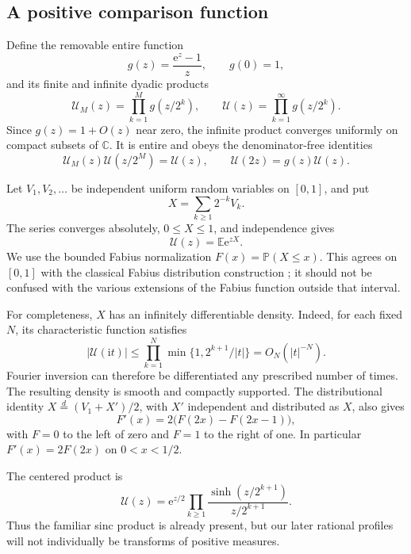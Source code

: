 \documentclass[11pt,letterpaper]{article}
\numberwithin{equation}{section}
\theoremstyle{definition}
\theoremstyle{remark}
\newcommand{\C}{\mathbb C}
\newcommand{\ii}{\mathrm i}
\newcommand{\E}{\mathbb E}
\newcommand{\Prob}{\mathbb P}
\newcommand{\Up}{\mathcal U}
\newcommand{\e}{\mathrm e}
\begin{document}
\subsection{A positive comparison function}
Define the removable entire function
\begin{equation}
 g(z)=\frac{\e^z-1}{z},\qquad g(0)=1,
\end{equation}
and its finite and infinite dyadic products
\begin{equation}
 \Up_M(z)=\prod_{k=1}^M g(z/2^k),\qquad
 \Up(z)=\prod_{k=1}^{\infty}g(z/2^k).
 \label{eq:U}
\end{equation}
Since \(g(z)=1+O(z)\) near zero, the infinite product converges uniformly on compact subsets of \(\C\). It is entire and obeys the denominator-free identities
\begin{equation}
 \Up_M(z)\Up(z/2^M)=\Up(z),\qquad
 \Up(2z)=g(z)\Up(z).
 \label{eq:Utail}
\end{equation}

Let \(V_1,V_2,\ldots\) be independent uniform random variables on \([0,1]\), and put
\begin{equation}
 X=\sum_{k\geq1}2^{-k}V_k.
 \label{eq:FabiusX}
\end{equation}
The series converges absolutely, \(0\leq X\leq1\), and independence gives
\begin{equation}
 \Up(z)=\E\e^{zX}.
 \label{eq:Umgf}
\end{equation}
We use the bounded Fabius normalization \(F(x)=\Prob(X\leq x)\). This agrees on \([0,1]\) with the classical Fabius distribution construction \cite{fabius}; it should not be confused with the various extensions of the Fabius function outside that interval.

For completeness, \(X\) has an infinitely differentiable density. Indeed, for each fixed \(N\), its characteristic function satisfies
\[
 |\Up(\ii t)|\leq \prod_{k=1}^N\min\{1,2^{k+1}/|t|\}
 =O_N(|t|^{-N}).
\]
Fourier inversion can therefore be differentiated any prescribed number of times. The resulting density is smooth and compactly supported. The distributional identity \(X\overset d=(V_1+X')/2\), with \(X'\) independent and distributed as \(X\), also gives
\begin{equation}
 F'(x)=2\bigl(F(2x)-F(2x-1)\bigr),
\end{equation}
with \(F=0\) to the left of zero and \(F=1\) to the right of one. In particular \(F'(x)=2F(2x)\) on \(0<x<1/2\).

The centered product is
\begin{equation}
 \Up(z)=\e^{z/2}\prod_{k\geq1}
 \frac{\sinh(z/2^{k+1})}{z/2^{k+1}}.
 \label{eq:Usinh}
\end{equation}
Thus the familiar sinc product is already present, but our later rational profiles will not individually be transforms of positive measures.
\end{document}
